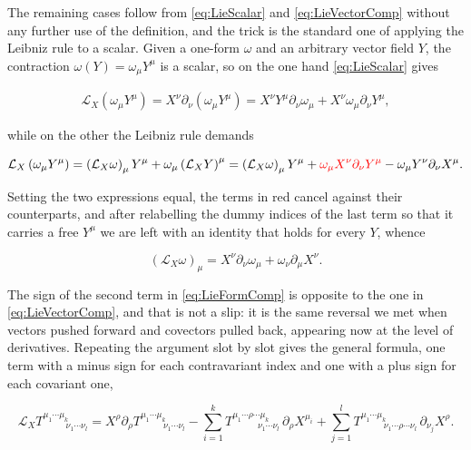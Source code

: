         The remaining cases follow from \ref{eq:LieScalar} and \ref{eq:LieVectorComp} without any further use of the definition, and the trick is the standard one of applying the Leibniz rule to a scalar. Given a one-form $\omega$ and an arbitrary vector field $Y$, the contraction $\omega(Y) = \omega_{\mu}Y^{\mu}$ is a scalar, so on the one hand \ref{eq:LieScalar} gives

        \begin{align*}
            \mathcal{L}_X\left(\omega_{\mu}Y^{\mu}\right) = X^{\nu}\partial_{\nu}\left(\omega_{\mu}Y^{\mu}\right) = X^{\nu}Y^{\mu}\partial_{\nu}\omega_{\mu} + X^{\nu}\omega_{\mu}\partial_{\nu}Y^{\mu},
        \end{align*}

        while on the other the Leibniz rule demands

        \begin{align*}
            \mathcal{L}_X\left(\omega_{\mu}Y^{\mu}\right) = \left(\mathcal{L}_X\omega\right)_{\mu}Y^{\mu} + \omega_{\mu}\left(\mathcal{L}_XY\right)^{\mu} = \left(\mathcal{L}_X\omega\right)_{\mu}Y^{\mu} + {\color{red}\omega_{\mu}X^{\nu}\partial_{\nu}Y^{\mu}} - \omega_{\mu}Y^{\nu}\partial_{\nu}X^{\mu}.
        \end{align*}

        Setting the two expressions equal, the terms in red cancel against their counterparts, and after relabelling the dummy indices of the last term so that it carries a free $Y^{\mu}$ we are left with an identity that holds for every $Y$, whence

        \begin{equation}\label{eq:LieFormComp}
            \left(\mathcal{L}_X\omega\right)_{\mu} = X^{\nu}\partial_{\nu}\omega_{\mu} + \omega_{\nu}\partial_{\mu}X^{\nu}.
        \end{equation}

        The sign of the second term in \ref{eq:LieFormComp} is opposite to the one in \ref{eq:LieVectorComp}, and that is not a slip: it is the same reversal we met when vectors pushed forward and covectors pulled back, appearing now at the level of derivatives. Repeating the argument slot by slot gives the general formula, one term with a minus sign for each contravariant index and one with a plus sign for each covariant one,

        \begin{equation}\label{eq:LieTensorComp}
            \mathcal{L}_XT^{\mu_1\cdots\mu_k}_{\qquad\;\;\nu_1\cdots\nu_l} = X^{\rho}\partial_{\rho}T^{\mu_1\cdots\mu_k}_{\qquad\;\;\nu_1\cdots\nu_l} - \sum_{i=1}^{k}T^{\mu_1\cdots\rho\cdots\mu_k}_{\qquad\;\;\;\nu_1\cdots\nu_l}\,\partial_{\rho}X^{\mu_i} + \sum_{j=1}^{l}T^{\mu_1\cdots\mu_k}_{\qquad\;\;\nu_1\cdots\rho\cdots\nu_l}\,\partial_{\nu_j}X^{\rho}.
        \end{equation}

